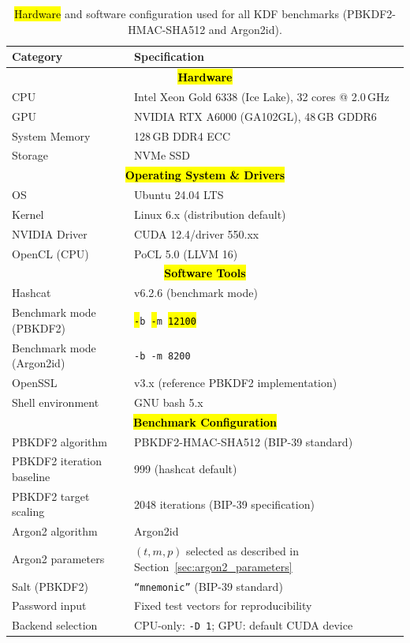\documentclass[mathematics,article,accept,pdftex,moreauthors]{Definitions/mdpi}
\begin{document}
\begin{table}[H]
\caption{\hl{Hardware} and software configuration used for all KDF benchmarks (PBKDF2-HMAC-SHA512 and Argon2id).}
\label{tab:exp_setup}
\begin{tabularx}{\linewidth}{ll}
\toprule
\textbf{Category} & \textbf{Specification} \\
\midrule
\multicolumn{2}{c}{\textbf{\hl{Hardware} %
}} \\
\midrule
CPU & Intel Xeon Gold 6338 (Ice Lake), 32 cores @ 2.0\,GHz \\
GPU & NVIDIA RTX A6000 (GA102GL), 48\,GB GDDR6 \\
System Memory & 128\,GB DDR4 ECC \\
Storage & NVMe SSD \\
\midrule
\multicolumn{2}{c}{\textbf{\hl{Operating System \& Drivers}}} \\
\midrule
OS & Ubuntu 24.04 LTS \\
Kernel & Linux 6.x (distribution default) \\
NVIDIA Driver & CUDA 12.4/driver 550.xx \\
OpenCL (CPU) & PoCL 5.0 (LLVM 16) \\
\midrule
\multicolumn{2}{c}{\textbf{\hl{Software Tools}}} \\
\midrule
Hashcat & v6.2.6 (benchmark mode) \\
Benchmark mode (PBKDF2) & \texttt{\hl{-}b \hl{-}m \hl{12100}} \\ %
Benchmark mode (Argon2id) & \texttt{-b -m 8200} \\
OpenSSL & v3.x (reference PBKDF2 implementation) \\
Shell environment & GNU bash 5.x \\
\midrule
\multicolumn{2}{c}{\textbf{\hl{Benchmark Configuration}}} \\
\midrule
PBKDF2 algorithm & PBKDF2-HMAC-SHA512 (BIP-39 standard) \\
PBKDF2 iteration baseline & 999 (hashcat default) \\
PBKDF2 target scaling & 2048 iterations (BIP-39 specification) \\
Argon2 algorithm & Argon2id \\
Argon2 parameters & $(t,m,p)$ selected as described in Section~\ref{sec:argon2_parameters} \\
Salt (PBKDF2) & \texttt{``mnemonic''} (BIP-39 standard) \\
Password input & Fixed test vectors for reproducibility \\
Backend selection & CPU-only: \texttt{-D 1}; GPU: default CUDA device \\
\bottomrule
\end{tabularx}
\end{table}
\end{document}

